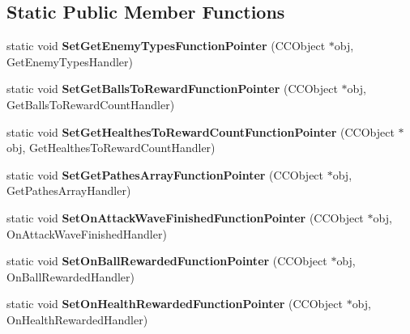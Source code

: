 \subsection*{Static Public Member Functions}
\begin{DoxyCompactItemize}
\item 
\hypertarget{class_j_g___attack_wave___base_a28fdfe584c2c0a1edaca1a2af26e249d}{static void {\bfseries Set\-Get\-Enemy\-Types\-Function\-Pointer} (C\-C\-Object $\ast$obj, Get\-Enemy\-Types\-Handler)}\label{class_j_g___attack_wave___base_a28fdfe584c2c0a1edaca1a2af26e249d}

\item 
\hypertarget{class_j_g___attack_wave___base_a88332e1e9cc50c5a4fea9597e671265b}{static void {\bfseries Set\-Get\-Balls\-To\-Reward\-Function\-Pointer} (C\-C\-Object $\ast$obj, Get\-Balls\-To\-Reward\-Count\-Handler)}\label{class_j_g___attack_wave___base_a88332e1e9cc50c5a4fea9597e671265b}

\item 
\hypertarget{class_j_g___attack_wave___base_a7bdfecac590df871ea6ebf20e15cfd5e}{static void {\bfseries Set\-Get\-Healthes\-To\-Reward\-Count\-Function\-Pointer} (C\-C\-Object $\ast$obj, Get\-Healthes\-To\-Reward\-Count\-Handler)}\label{class_j_g___attack_wave___base_a7bdfecac590df871ea6ebf20e15cfd5e}

\item 
\hypertarget{class_j_g___attack_wave___base_a8f5501c1c075ca3caefc6ecf658dc30c}{static void {\bfseries Set\-Get\-Pathes\-Array\-Function\-Pointer} (C\-C\-Object $\ast$obj, Get\-Pathes\-Array\-Handler)}\label{class_j_g___attack_wave___base_a8f5501c1c075ca3caefc6ecf658dc30c}

\item 
\hypertarget{class_j_g___attack_wave___base_abd53fbe4eedf618f8e4bd1ffcaae79e7}{static void {\bfseries Set\-On\-Attack\-Wave\-Finished\-Function\-Pointer} (C\-C\-Object $\ast$obj, On\-Attack\-Wave\-Finished\-Handler)}\label{class_j_g___attack_wave___base_abd53fbe4eedf618f8e4bd1ffcaae79e7}

\item 
\hypertarget{class_j_g___attack_wave___base_a2a7e9d8911bc8caec44c0f93694014e6}{static void {\bfseries Set\-On\-Ball\-Rewarded\-Function\-Pointer} (C\-C\-Object $\ast$obj, On\-Ball\-Rewarded\-Handler)}\label{class_j_g___attack_wave___base_a2a7e9d8911bc8caec44c0f93694014e6}

\item 
\hypertarget{class_j_g___attack_wave___base_a8981101a620ac614e91db73449b61a2e}{static void {\bfseries Set\-On\-Health\-Rewarded\-Function\-Pointer} (C\-C\-Object $\ast$obj, On\-Health\-Rewarded\-Handler)}\label{class_j_g___attack_wave___base_a8981101a620ac614e91db73449b61a2e}


\end{DoxyCompactItemize}
